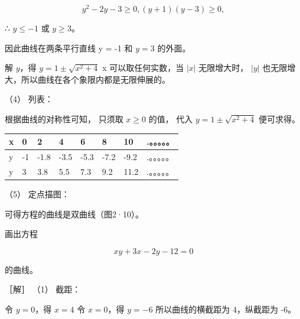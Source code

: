 \[
y^{2} - 2 y - 3 \geqslant 0, (y + 1) (y - 3) \geqslant 0,
\]

∴ \(y \leqslant -1\) 或 \(y \geqslant 3\)。

因此曲线在两条平行直线 y = -1 和 \(y = 3\) 的外面。

解 \(y\)，得 \(y = 1 \pm \sqrt{x^2 + 4}\) x 可以取任何实数，当 \(|x|\)
无限增大时， \(|y|\) 也无限增大，所以曲线在各个象限内都是无限伸展的。

（4） 列表：

根据曲线的对称性可知， 只须取 \(x \geqslant 0\) 的值， 代入
\(y = 1 \pm \sqrt{x^2 + 4}\) 便可求得。

{\def\LTcaptype{none} %
\begin{longtable}[]{@{}llllllll@{}}
\toprule\noalign{}
x & 0 & 2 & 4 & 6 & 8 & 10 & .。。。。。 \\
\midrule\noalign{}
\endhead
\bottomrule\noalign{}
\endlastfoot
y & -1 & -1.8 & -3.5 & -5.3 & -7.2 & -9.2 & .。。。。。 \\
y & 3 & 3.8 & 5.5 & 7.3 & 9.2 & 11.2 & .。。。。。 \\
\end{longtable}
}

（5） 定点描图：

可得方程的曲线是双曲线（图2·10）。

画出方程

\[
x y + 3 x - 2 y - 12 = 0
\]

的曲线。

［解］ （1） 截距：

令 \(y = 0\)，得 \(x = 4\) 令 \(x = 0\)，得 \(y = -6\)
所以曲线的横截距为 4，纵截距为 -6。

